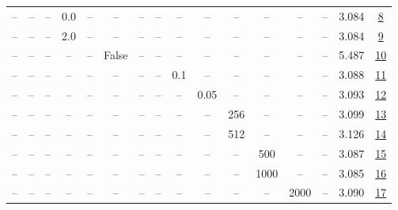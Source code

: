 \begin{table}[H]
\begin{tabular}{cccccccccccccccc}
-- & -- & -- & 0.0 & -- & -- & -- & -- & -- & -- & -- & -- & -- & -- & 3.084 & \href{https://wandb.ai/marin-community/optimizer-scaling/runs/sweep-520m-10B-krona6ace9lr0.001-wd0.5-b10.95-plr0.2-pis1-gn0.0--04c9a1}{8} \\
-- & -- & -- & 2.0 & -- & -- & -- & -- & -- & -- & -- & -- & -- & -- & 3.084 & \href{https://wandb.ai/marin-community/optimizer-scaling/runs/sweep-520m-10B-kron3b9e66lr0.001-wd0.5-b10.95-plr0.2-pis1-gn2.0--0c6f01}{9} \\
-- & -- & -- & -- & -- & False & -- & -- & -- & -- & -- & -- & -- & -- & 5.487 & \href{https://wandb.ai/marin-community/optimizer-scaling/runs/sweep-520m-10B-kronb8e354lr0.001-wd0.5-b10.95-plr0.2-pis1-gn1-no-928921}{10} \\
-- & -- & -- & -- & -- & -- & -- & -- & 0.1 & -- & -- & -- & -- & -- & 3.088 & \href{https://wandb.ai/marin-community/optimizer-scaling/runs/sweep-520m-10B-kron2ec659lr0.001-wd0.5-b10.95-plr0.1-pis1-gn1-no-22bed3}{11} \\
-- & -- & -- & -- & -- & -- & -- & -- & -- & 0.05 & -- & -- & -- & -- & 3.093 & \href{https://wandb.ai/marin-community/optimizer-scaling/runs/sweep-520m-10B-kron2f3c38lr0.001-wd0.5-b10.95-plr0.2-pis1-gn1-no-99d3a4}{12} \\
-- & -- & -- & -- & -- & -- & -- & -- & -- & -- & 256 & -- & -- & -- & 3.099 & \href{https://wandb.ai/marin-community/optimizer-scaling/runs/sweep-520m-10B-kron798587lr0.001-wd0.5-b10.95-plr0.2-pis1-gn1-no-fcd346}{13} \\
-- & -- & -- & -- & -- & -- & -- & -- & -- & -- & 512 & -- & -- & -- & 3.126 & \href{https://wandb.ai/marin-community/optimizer-scaling/runs/sweep-520m-10B-kron8f965elr0.001-wd0.5-b10.95-plr0.2-pis1-gn1-no-589914}{14} \\
-- & -- & -- & -- & -- & -- & -- & -- & -- & -- & -- & 500 & -- & -- & 3.087 & \href{https://wandb.ai/marin-community/optimizer-scaling/runs/sweep-520m-10B-krona2e0delr0.001-wd0.5-b10.95-plr0.2-pis1-gn1-no-f9eafc}{15} \\
-- & -- & -- & -- & -- & -- & -- & -- & -- & -- & -- & 1000 & -- & -- & 3.085 & \href{https://wandb.ai/marin-community/optimizer-scaling/runs/sweep-520m-10B-kron4297d5lr0.001-wd0.5-b10.95-plr0.2-pis1-gn1-no-b6a2c5}{16} \\
-- & -- & -- & -- & -- & -- & -- & -- & -- & -- & -- & -- & 2000 & -- & 3.090 & \href{https://wandb.ai/marin-community/optimizer-scaling/runs/sweep-520m-10B-kron7f1bb9lr0.001-wd0.5-b10.95-plr0.2-pis1-gn1-no-4a18ea}{17} \\

\end{tabular}
\end{table}
